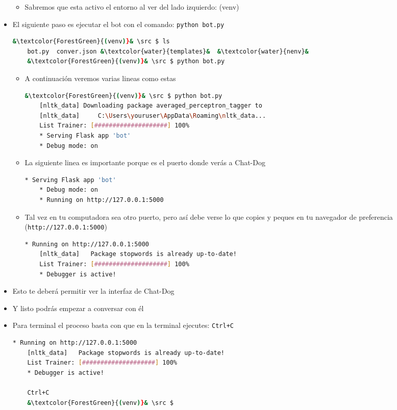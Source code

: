 \documentclass[a4paper,12pt]{article}
\begin{document}
\begin{itemize}
\begin{itemize}
\item Sabremos que esta activo el entorno al ver del lado izquierdo: (venv)

\end{itemize}

\item El siguiente paso es ejecutar el bot con el comando: \texttt{python bot.py}
\begin{lstlisting}[language=bash]    
    &\textcolor{ForestGreen}{(venv)}& \src $ ls
    bot.py  conver.json &\textcolor{water}{templates}&  &\textcolor{water}{nenv}&
    &\textcolor{ForestGreen}{(venv)}& \src $ python bot.py
\end{lstlisting}
\begin{itemize}
    \item A continuación veremos varias lineas como estas
\begin{lstlisting}[language=bash]    
    &\textcolor{ForestGreen}{(venv)}& \src $ python bot.py
    [nltk_data] Downloading package averaged_perceptron_tagger to
    [nltk_data]     C:\Users\youruser\AppData\Roaming\nltk_data...
    List Trainer: [####################] 100%
    * Serving Flask app 'bot'
    * Debug mode: on    
\end{lstlisting}
    \item La siguiente linea es importante porque es el puerto donde verás a Chat-Dog
\begin{lstlisting}[language=bash]        
    * Serving Flask app 'bot'
    * Debug mode: on    
    * Running on http://127.0.0.1:5000
\end{lstlisting}
    \item Tal vez en tu computadora sea otro puerto, pero así debe verse lo que copies y peques en tu navegador de preferencia (\texttt{http://127.0.0.1:5000})
\begin{lstlisting}[language=bash]        
    * Running on http://127.0.0.1:5000
    [nltk_data]   Package stopwords is already up-to-date!
    List Trainer: [####################] 100%
    * Debugger is active!


\end{lstlisting}
\end{itemize}

\item Esto te deberá permitir ver la interfaz de Chat-Dog
\item Y listo podrás empezar a conversar con él 
\item Para terminal el proceso basta con que en la terminal ejecutes: \texttt{Ctrl+C}
\begin{lstlisting}[language=bash]        
    * Running on http://127.0.0.1:5000
    [nltk_data]   Package stopwords is already up-to-date!
    List Trainer: [####################] 100%
    * Debugger is active!

    Ctrl+C
    &\textcolor{ForestGreen}{(venv)}& \src $
\end{lstlisting}

\end{itemize}
\end{document}
